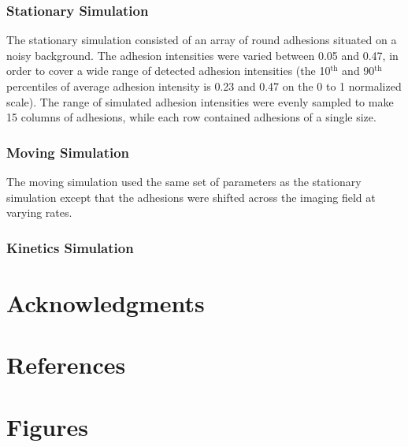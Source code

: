 \documentclass[10pt]{article}
\begin{document}
\subsubsection*{Stationary Simulation}

The stationary simulation consisted of an array of round adhesions situated on a
noisy background. The adhesion intensities were varied between 0.05 and 0.47,
in order to cover a wide range of detected adhesion intensities (the
10$^\text{th}$ and 90$^\text{th}$ percentiles of average adhesion intensity is
0.23 and 0.47 on the 0 to 1 normalized scale). The range of simulated adhesion
intensities were evenly sampled to make 15 columns of adhesions, while each row
contained adhesions of a single size.

\subsubsection*{Moving Simulation}

The moving simulation used the same set of parameters as the stationary
simulation except that the adhesions were shifted across the imaging field at
varying rates.  

\subsubsection*{Kinetics Simulation}



\section*{Acknowledgments}

\section*{References}


\section*{Figures}
\end{document}
